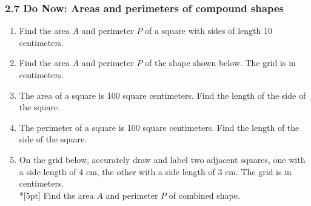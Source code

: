 \documentclass[12pt, twoside]{article}
\begin{document}
\subsubsection*{2.7 Do Now: Areas and perimeters of compound shapes}
  \vspace{0.25cm}
  \begin{enumerate}

    \item Find the area $A$ and perimeter $P$ of a square with sides of length 10 centimeters. \vspace{4cm}
    
    \item Find the area $A$ and perimeter $P$ of the shape shown below. The grid is in centimeters.
    \begin{flushleft}
    \end{flushleft}
      
    \item The area of a square is 100 square centimeters. Find the length of the side of the square. \vspace{3cm}
    
    \item The perimeter of a square is 100 square centimeters. Find the length of the side of the square.

    \newpage


    \item On the grid below, accurately draw and label two adjacent squares, one with a side length of 4 cm, the other with a side length of 3 cm. The grid is in centimeters.\\*[5pt]
    Find the area $A$ and perimeter $P$ of combined shape.
    \begin{flushleft}
    \end{flushleft} \vspace{1cm} 


\end{enumerate}
\end{document}
